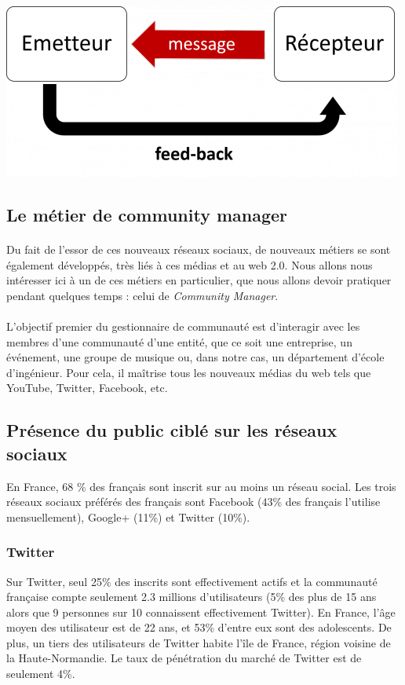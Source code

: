 \begin{center}
\includegraphics[scale=0.5]{./image/communication_digitale.png}
\end{center}

\subsection{Le métier de community manager}

\paragraph{}
Du fait de l'essor de ces nouveaux réseaux sociaux, de nouveaux métiers se sont également développés, 
très liés à ces médias et au web 2.0. Nous allons nous intéresser ici à un de ces métiers en particulier, 
que nous allons devoir pratiquer pendant quelques temps : celui de \emph{Community Manager}.

\paragraph{}
L'objectif premier du gestionnaire de communauté est d'interagir avec les membres d'une communauté d'une 
entité, que ce soit une entreprise, un événement, une groupe de musique ou, dans notre cas, un département 
d'école d'ingénieur. Pour cela, il maîtrise tous les nouveaux médias du web tels que YouTube, Twitter, 
Facebook, etc. 

\subsection{Présence du public ciblé sur les réseaux sociaux}
En France, 68 \% des français sont inscrit sur au moins un réseau social. Les trois réseaux sociaux préférés des français sont Facebook (43\% des français l'utilise mensuellement), Google+ (11\%) et Twitter (10\%).

\subsubsection{Twitter}
Sur Twitter, seul 25\% des inscrits sont effectivement actifs et la communauté française compte seulement 2.3 millions d'utilisateurs (5\% des plus de 15 ans alors que 9 personnes sur 10 connaissent effectivement Twitter).
En France, l'âge moyen des utilisateur est de 22 ans, et 53\% d'entre eux sont des adolescents. De plus, un tiers des utilisateurs de Twitter habite l'île de France, région voisine de la Haute-Normandie. Le taux de pénétration du marché de Twitter est de seulement 4\%.

